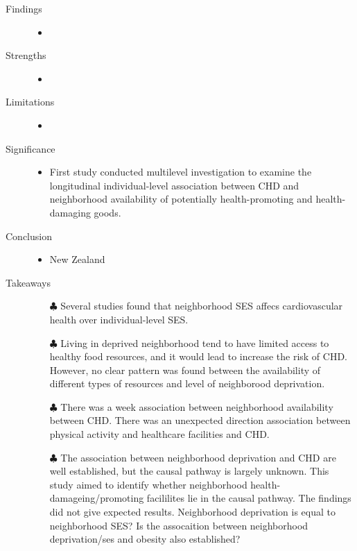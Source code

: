 \documentclass{article}
\begin{document}
\begin{itemize}
\begin{description}
			\item[Findings]\mbox{}\par
				\begin{itemize}
					\item 
				\end{itemize}
			\item[Strengths]\mbox{}\par
				\begin{itemize}
					\item
				\end{itemize}
			\item[Limitations]\mbox{}\par
				\begin{itemize}
					\item
				\end{itemize}
			\item[Significance]\mbox{}\par 
				\begin{itemize}
					\item First study conducted multilevel investigation to examine the longitudinal individual-level association between CHD and neighborhood availability of potentially health-promoting and health-damaging goods. 
				\end{itemize}
			\item[Conclusion] \mbox{}\par
				\begin{itemize}
					\item New Zealand
				\end{itemize}
			\item[Takeaways] \mbox{}\par
				\begin{itemize}
					\item[$\clubsuit$] Several studies found that neighborhood SES affecs cardiovascular health over individual-level SES.
					\item[$\clubsuit$] Living in deprived neighborhood tend to have limited access to healthy food resources, and it would lead to increase the risk of CHD. However, no clear pattern was found between the availability of different types of resources and level of neighborood deprivation. 
					\item[$\clubsuit$] There was a week association between neighborhood availability between CHD. There was an unexpected direction association between physical activity and healthcare facilities and CHD. 
					\item[$\clubsuit$] The association between neighborhood deprivation and CHD are well established, but the causal pathway is largely unknown. This study aimed to identify whether neighborhood health-damageing/promoting facililites lie in the causal pathway. The findings did not give expected results. Neighborhood deprivation is equal to neighborhood SES? Is the assocaition between neighborhood deprivation/ses and obesity also established? 
				\end{itemize} 
		\end{description}


\end{itemize}
\end{document}
